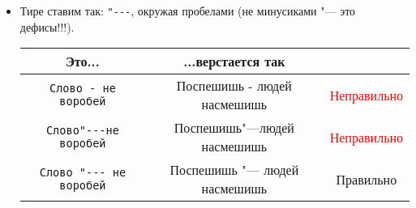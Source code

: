\documentclass[12pt,a4paper]{book}
\newcommand{\ok}{& \textcolor{green!60!black}{Правильно}}
\newcommand{\bad}{& \textcolor{red}{Неправильно}}
\begin{document}
\begin{enumerate}
\begin{itemize}
\begin{center}
\begin{tabular}{|c|c|c|}
\hline \verb'$<a, \cfrac23>$' & $<a, \cfrac23>$ \bad \\
\hline \verb'\langle a, \cfrac23\rangle' & $\langle a, \cfrac23\rangle$ \bad \\
\hline \verb'\left<a, \cfrac23\right>' & $\left<a, \cfrac23\right>$ \ok \\
\hline
\end{tabular}\end{center}
\item Тире ставим так: \verb'"---', окружая пробелами (не минусиками "--- это дефисы!!!).
\begin{center}\begin{tabular}{|c|c|c|}
\hline Это... & ...верстается так & \\
\hline \verb'Слово - не воробей' & Поспешишь - людей насмешишь \bad \\
\hline \verb'Слово"---не воробей' & Поспешишь"---людей насмешишь \bad \\
\hline \verb'Слово "--- не воробей' & Поспешишь "--- людей насмешишь \ok \\
\hline
\end{tabular}\end{center}
\end{itemize}
\end{enumerate}
\end{document}
